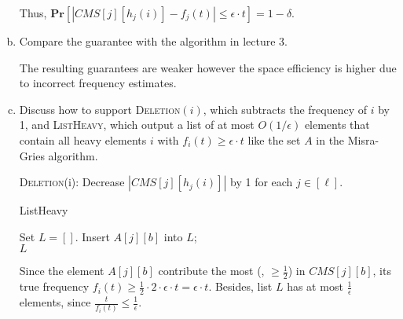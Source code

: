 \begin{problem}[40 points]
\begin{enumerate}[(a)]
        Thus, $ \mathbf{Pr}[|CMS[j][h_j(i)]-f_j(t)| \le \epsilon \cdot t] = 1-\delta$.

        \item Compare the guarantee with the algorithm in lecture 3.
        
        \Answer
        The resulting guarantees are weaker however the space efficiency is higher due to incorrect frequency estimates.

        \item Discuss how to support \textsc{Deletion}$(i)$, which subtracts the frequency of $i$ by 1, and
        \textsc{ListHeavy}, which output a list of at most $O(1/\epsilon)$ elements that contain all heavy elements $i$ with $f_i(t) \geq \epsilon \cdot t$ like the set $A$ in the Misra-Gries algorithm.

        \Answer
        \textsc{Deletion}(i): Decrease $|CMS[j][h_j(i)]|$ by 1 for each $j \in [\ell]$.
        

        \begin{algorithm}[ht]
            \caption{ListHeavy}
            \begin{algorithmic}[1]
                \State Set $L= [ ]$.
                        \State Insert $A[j][b]$ into $L$;
                    \EndIf
                \EndFor
            \EndFor \\
            \Return $L$
            \end{algorithmic}
            \end{algorithm}

            Since the element $A[j][b]$ contribute the most (\ie , $\geq \frac{1}{2}$) in $CMS[j][b]$, its true frequency $f_i(t) \geq \frac{1}{2}\cdot 2 \cdot \epsilon \cdot t = \epsilon \cdot t$. Besides, list $L$ has at most $\frac{1}{\epsilon}$ elements, since $\frac{t}{f_i(t)}\leq \frac{1}{\epsilon}$.
    \end{enumerate}
\end{problem}


